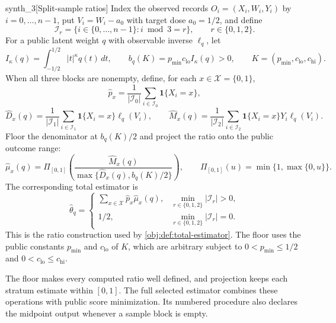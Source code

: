 \begin{definitionv}{synth_3}[Split-sample ratios]
Index the observed records \(O_i=(X_i,W_i,Y_i)\) by \(i=0,\ldots,n-1\), put \(V_i=W_i-a_0\) with target dose \(a_0=1/2\), and define
\[
\mathcal I_r=\{i\in\{0,\ldots,n-1\}:i\bmod3=r\},
\qquad r\in\{0,1,2\}.
\]
For a public latent weight \(q\) with observable inverse \(\ell_q\), let
\[
I_\kappa(q)=\int_{-1/2}^{1/2}|t|^\kappa q(t)\,dt,
\qquad
b_q(K)=p_{\min}c_{\mathrm{lo}}I_\kappa(q)>0,
\qquad K=(p_{\min},c_{\mathrm{lo}},c_{\mathrm{hi}}).
\]
When all three blocks are nonempty, define, for each \(x\in\mathcal X=\{0,1\}\),
\[
\widehat p_x
=\frac1{|\mathcal I_0|}\sum_{i\in\mathcal I_0}\mathbf1\{X_i=x\},
\]
\[
\widehat D_x(q)
=\frac1{|\mathcal I_1|}\sum_{i\in\mathcal I_1}\mathbf1\{X_i=x\}\ell_q(V_i),
\qquad
\widehat M_x(q)
=\frac1{|\mathcal I_2|}\sum_{i\in\mathcal I_2}\mathbf1\{X_i=x\}Y_i\ell_q(V_i).
\]
Floor the denominator at \(b_q(K)/2\) and project the ratio onto the public outcome range:
\[
\widehat\mu_x(q)
=\Pi_{[0,1]}\!\left(
\frac{\widehat M_x(q)}{\max\{\widehat D_x(q),b_q(K)/2\}}
\right),
\qquad
\Pi_{[0,1]}(u)=\min\{1,\max\{0,u\}\}.
\]
The corresponding total estimator is
\[
\widehat\theta_q
=
\begin{cases}
\displaystyle\sum_{x\in\mathcal X}\widehat p_x\widehat\mu_x(q),
&\min_{r\in\{0,1,2\}}|\mathcal I_r|>0,\\
1/2,&\min_{r\in\{0,1,2\}}|\mathcal I_r|=0.
\end{cases}
\]
This is the ratio construction used by \cref{obj:def:total-estimator}. The floor uses the public constants \(p_{\min}\) and \(c_{\mathrm{lo}}\) of \(K\), which are arbitrary subject to \(0<p_{\min}\le1/2\) and \(0<c_{\mathrm{lo}}\le c_{\mathrm{hi}}\).
\end{definitionv}

The floor makes every computed ratio well defined, and projection keeps each stratum estimate within \([0,1]\). The full selected estimator  combines these operations with public score minimization. Its numbered procedure also declares the midpoint output whenever a sample block is empty.

